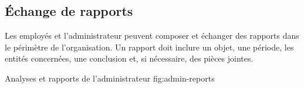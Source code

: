\subsection{Échange de rapports}

Les employés et l'administrateur peuvent composer et échanger des rapports
dans le périmètre de l'organisation. Un rapport doit inclure un objet, une
période, les entités concernées, une conclusion et, si nécessaire, des pièces
jointes.


  {Analyses et rapports de l'administrateur}
  {fig:admin-reports}
